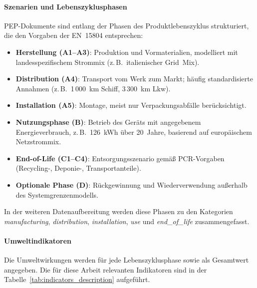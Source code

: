 \paragraph{Szenarien und Lebenszyklusphasen}
PEP-Dokumente sind entlang der Phasen des Produktlebenszyklus strukturiert, die den Vorgaben der EN~15804 entsprechen:
\begin{itemize}
    \item \textbf{Herstellung (A1--A3)}: Produktion und Vormaterialien, modelliert mit landesspezifischem Strommix (z.\,B.\ italienischer Grid~Mix).
    \item \textbf{Distribution (A4)}: Transport vom Werk zum Markt; häufig standardisierte Annahmen (z.\,B.\ 1\,000~km Schiff, 3\,300~km Lkw).
    \item \textbf{Installation (A5)}: Montage, meist nur Verpackungsabfälle berücksichtigt.
    \item \textbf{Nutzungsphase (B)}: Betrieb des Geräts mit angegebenem Energieverbrauch, z.\,B.\ 126~kWh über 20~Jahre, basierend auf europäischem Netzstrommix.
    \item \textbf{End-of-Life (C1--C4)}: Entsorgungsszenario gemäß PCR-Vorgaben (Recycling-, Deponie-, Transportanteile).
    \item \textbf{Optionale Phase (D)}: Rückgewinnung und Wiederverwendung außerhalb des Systemgrenzenmodells.
\end{itemize}
In der weiteren Datenaufbereitung werden diese Phasen zu den Kategorien \emph{manufacturing}, \emph{distribution}, \emph{installation}, 
\emph{use} und \emph{end\_of\_life} zusammengefasst.

\paragraph{Umweltindikatoren}
Die Umweltwirkungen werden für jede Lebenszyklusphase sowie als Gesamtwert angegeben.  
Die für diese Arbeit relevanten Indikatoren sind in der Tabelle~\ref{tab:indicators_description} aufgeführt.

